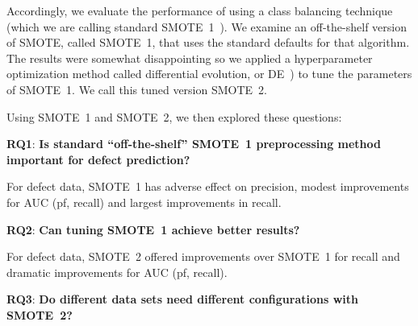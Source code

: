 \documentclass[sigconf,review, anonymous]{acmart}
\theoremstyle{break}
\theoremstyle{break}
\begin{document}

Accordingly,   we evaluate the performance of using a class balancing technique (which we are calling standard SMOTE~1~\cite{chawla2002smote}).
We examine an off-the-shelf version
of SMOTE, called SMOTE~1, that uses
the standard defaults for that algorithm. 
The results were somewhat disappointing
so we applied a hyperparameter optimization
method called differential evolution, or DE~\cite{storn1997differential}) to tune the parameters of SMOTE~1. 
We call this tuned version SMOTE~2.

Using SMOTE~1 and SMOTE~2, we then
explored  these  questions:  
 
  \textbf{RQ1}: \textbf{Is standard ``off-the-shelf'' SMOTE~1 preprocessing method important for defect prediction?} 

 \begin{lesson}For defect data, SMOTE~1 has adverse effect on 
 precision, modest improvements for AUC (pf, recall) and largest improvements in recall.
 \end{lesson}

 \textbf{RQ2}: \textbf{Can tuning SMOTE~1  achieve better results?} 
 
 \begin{lesson}For defect data, SMOTE~2  
 offered    improvements over SMOTE~1 for recall
 and dramatic improvements for AUC (pf, recall).
 \end{lesson}
 
 \textbf{RQ3}: \textbf{Do different data sets
      need different configurations with SMOTE~2?} 
 
\end{document}

